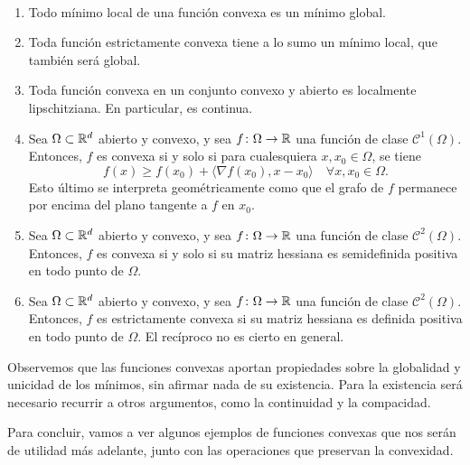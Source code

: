 \documentclass{book}
\begin{document}
\begin{prop}~
	\begin{enumerate}
		\item Todo mínimo local de una función convexa es un mínimo global.
		\item Toda función estrictamente convexa tiene a lo sumo un mínimo local, que también será global.
		\item Toda función convexa en un conjunto convexo y abierto es localmente lipschitziana. En particular, es continua.
		\item Sea $\Omega \subset \mathbb{R}^d$ abierto y convexo, y sea $f \colon \Omega \to \mathbb{R}$ una función de clase $\mathcal{C}^1(\Omega)$. Entonces, $f$ es convexa si y solo si para cualesquiera $x, x_0 \in \Omega$, se tiene
		\[ f(x) \ge f(x_0) + \langle \nabla f(x_0), x - x_0 \rangle \quad \forall x, x_0 \in \Omega. \]
		Esto último se interpreta geométricamente como que el grafo de $f$ permanece por encima del plano tangente a $f$ en $x_0$.
		\item Sea $\Omega \subset \mathbb{R}^d$ abierto y convexo, y sea $f \colon \Omega \to \mathbb{R}$ una función de clase $\mathcal{C}^2(\Omega)$. Entonces, $f$ es convexa si y solo si su matriz hessiana es semidefinida positiva en todo punto de $\Omega$.
		\item Sea $\Omega \subset \mathbb{R}^d$ abierto y convexo, y sea $f \colon \Omega \to \mathbb{R}$ una función de clase $\mathcal{C}^2(\Omega)$. Entonces, $f$ es estrictamente convexa si su matriz hessiana es definida positiva en todo punto de $\Omega$. El recíproco no es cierto en general.
	\end{enumerate}
\end{prop}
Observemos que las funciones convexas aportan propiedades sobre la globalidad y unicidad de los mínimos, sin afirmar nada de su existencia. Para la existencia será necesario recurrir a otros argumentos, como la continuidad y la compacidad.

Para concluir, vamos a ver algunos ejemplos de funciones convexas que nos serán de utilidad más adelante, junto con las operaciones que preservan la convexidad.
\end{document}
